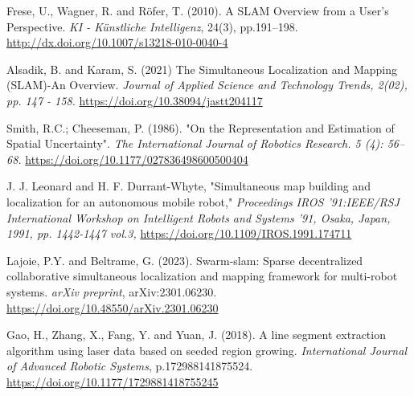 \documentclass[12pt]{article}
\begin{document}
\begin{thebibliography}{9}

    Frese, U., Wagner, R. and Röfer, T. (2010). A SLAM Overview from a User’s Perspective.
    \textit{KI - Künstliche Intelligenz}, 24(3), pp.191–198.
    \href{http://dx.doi.org/10.1007/s13218-010-0040-4}{http://dx.doi.org/10.1007/s13218-010-0040-4}

    Alsadik, B. and Karam, S. (2021) The Simultaneous Localization and Mapping (SLAM)-An Overview.
    \textit{Journal of Applied Science and Technology Trends, 2(02), pp. 147 - 158.}
    \href{https://doi.org/10.38094/jastt204117}{https://doi.org/10.38094/jastt204117}

    Smith, R.C.; Cheeseman, P. (1986). "On the Representation and Estimation of Spatial Uncertainty".
    \textit{The International Journal of Robotics Research. 5 (4): 56–68.}
    \href{https://doi.org/10.1177/027836498600500404}{https://doi.org/10.1177/027836498600500404}

    J. J. Leonard and H. F. Durrant-Whyte, "Simultaneous map building and localization for an autonomous mobile robot,"
    \textit{Proceedings IROS '91:IEEE/RSJ International Workshop on Intelligent Robots and Systems '91, Osaka, Japan, 1991, pp. 1442-1447 vol.3,}
    \href{https://doi.org/10.1109/IROS.1991.174711}{https://doi.org/10.1109/IROS.1991.174711}

    Lajoie, P.Y. and Beltrame, G. (2023). Swarm-slam: Sparse decentralized collaborative simultaneous localization and mapping framework for multi-robot systems.
    \textit{arXiv preprint},  arXiv:2301.06230.
    \href{https://doi.org/10.48550/arXiv.2301.06230}{https://doi.org/10.48550/arXiv.2301.06230}

    Gao, H., Zhang, X., Fang, Y. and Yuan, J. (2018). A line segment extraction algorithm using laser data based on seeded region growing.
    \textit{ International Journal of Advanced Robotic Systems}, p.172988141875524.
    \href{https://doi.org/10.1177/1729881418755245}{https://doi.org/10.1177/1729881418755245}

\end{thebibliography}
\end{document}
